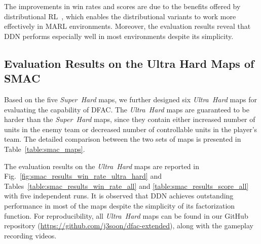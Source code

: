 \documentclass[twoside,11pt]{article}
\newcommand{\superhard}{\textit{Super~Hard}}
\newcommand{\ultrahard}{\textit{Ultra~Hard}}
\newcommand{\ddn}{DDN}
\begin{document}
The improvements in win rates and scores are due to the benefits offered by distributional RL~\citep{Lyle2019Comparative}, which enables the distributional variants to work more effectively in MARL environments. Moreover, the evaluation results reveal that \ddn{} performs especially well in most environments despite its simplicity.



\subsection{Evaluation Results on the Ultra Hard Maps of SMAC}
\label{subsec:experiment_results_ultra_hard}

Based on the five \superhard{} maps, we further designed six \ultrahard{} maps for evaluating the capability of DFAC. The \ultrahard{} maps are guaranteed to be harder than the \superhard{} maps, since they contain either increased number of units in the enemy team or decreased number of controllable units in the player's team. The detailed comparison between the two sets of maps is presented in Table~\ref{table:smac_maps}.

The evaluation results on the \ultrahard{} maps are reported in Fig.~\ref{fig:smac_results_win_rate_ultra_hard} and Tables~\ref{table:smac_results_win_rate_all} and \ref{table:smac_results_score_all} with five independent runs. It is observed that \ddn{} achieves outstanding performance in most of the maps despite the simplicity of its factorization function. For reproducibility, all \ultrahard{} maps can be found in our GitHub repository (\href{https://github.com/j3soon/dfac-extended}{https://github.com/j3soon/dfac-extended}), along with the gameplay recording videos.
\end{document}
